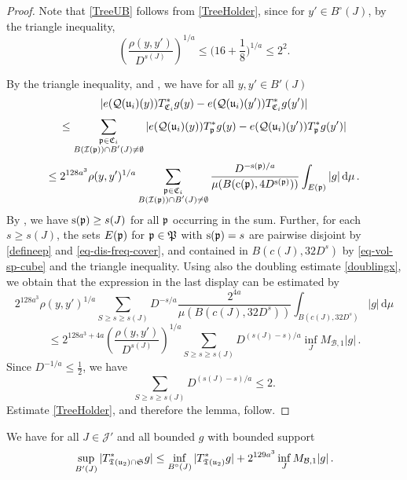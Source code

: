     \begin{proof}
        \leanok
        Note that \eqref{TreeUB} follows from \eqref{TreeHolder}, since for $y'\in B^\circ{}(J)$, by the triangle inequality,
        $$\left(\frac{\rho(y,y')}{D^{s(J)}}\right)^{1/a}\le \Big(16 + \frac{1}8\Big)^{1/a}\le 2^2.$$

        By the triangle inequality,  and , we have for all $y, y' \in B'(J)$
        \begin{equation}
            \label{eq-C-Lip}
            |e({\mathcal{Q}}({\mathfrak u}_i)(y)) T_{{\mathfrak C}_i}^* g(y) - e({\mathcal{Q}}({\mathfrak u}_i)(y')) T_{{\mathfrak C}_i}^* g(y')|
        \end{equation}
        $$
            \le \sum_{\substack{{\mathfrak p} \in {\mathfrak C}_i\\ B({\mathcal{I}}({\mathfrak p})) \cap B'(J) \neq \emptyset}} |e({\mathcal{Q}}({\mathfrak u}_i)(y)) T_{{\mathfrak p}}^* g(y) - e({\mathcal{Q}}({\mathfrak u}_i)(y')) T_{{\mathfrak p}}^* g(y')|
        $$
        $$
            \le 2^{128a^3}\rho(y,y')^{1/a} \sum_{\substack{{\mathfrak p} \in {\mathfrak C}_i\\ B({\mathcal{I}}({\mathfrak p})) \cap B'(J) \neq \emptyset}} \frac{D^{- {\mathrm{s}}({\mathfrak p})/a}}{\mu(B({\mathrm{c}}({\mathfrak p}), 4D^{{\mathrm{s}}({\mathfrak p})}))} \int_{E({\mathfrak p})} |g| \, \mathrm{d}\mu\,.
        $$
        By , we have ${\mathrm{s}}({\mathfrak p}) \ge s(J)$ for all ${\mathfrak p}$ occurring in the sum. Further, for each $s \ge s(J)$, the sets $E({\mathfrak p})$ for ${\mathfrak p} \in {\mathfrak P}$ with ${\mathrm{s}}({\mathfrak p}) = s$ are pairwise disjoint by \eqref{defineep} and \eqref{eq-dis-freq-cover}, and contained in $B(c(J), 32D^{s})$ by \eqref{eq-vol-sp-cube} and the triangle inequality. Using also the doubling estimate \eqref{doublingx}, we obtain that the expression in the last display can be estimated by
        $$
            2^{128a^3}\rho(y,y')^{1/a} \sum_{S \ge s \ge s(J)} D^{-s/a} \frac{2^{4a}}{\mu(B(c(J), 32D^{s}))} \int_{B(c(J), 32D^{s})} |g| \, \mathrm{d}\mu
        $$
        $$
            \le 2^{128a^3+4a} \left(\frac{\rho(y,y')}{D^{s(J)}}\right)^{1/a} \sum_{S \ge s \ge s(J)} D^{(s(J) - s)/a} \inf_J M_{\mathcal{B},1} |g|\,.
        $$
        Since $D^{-1/a}\le\frac12$, we have
        $$
            \sum_{S \ge s \ge s(J)} D^{(s(J) - s)/a} \le 2.
        $$
        Estimate \eqref{TreeHolder}, and therefore the lemma, follow.
    \end{proof}

    \begin{lemma}
        \label{global-tree-control-2}
        \leanok
        We have for all $J \in \mathcal{J}'$ and all bounded $g$ with bounded support
        $$
            \sup_{B'(J)} |T^*_{{\mathfrak T}({\mathfrak u}_2) \cap \mathfrak{S}} g| \le \inf_{B^\circ{}(J)} |T^*_{{\mathfrak T}({\mathfrak u}_2)} g| + 2^{129a^3} \inf_{J} M_{\mathcal{B},1}|g|\,.
        $$
    \end{lemma}

